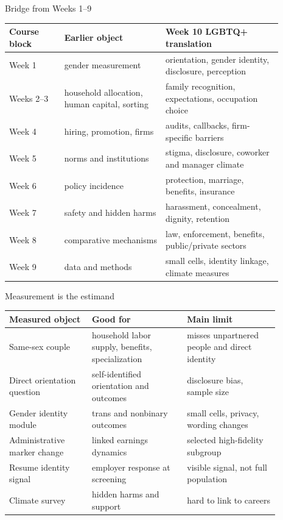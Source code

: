\documentclass[aspectratio=169,11pt]{beamer}
\begin{document}
\begin{frame}{Bridge from Weeks 1--9}
\scriptsize
\begin{tabular}{p{0.18\linewidth} p{0.33\linewidth} p{0.38\linewidth}}
\toprule
Course block & Earlier object & Week 10 LGBTQ+ translation \\
\midrule
Week 1 & gender measurement & orientation, gender identity, disclosure, perception \\
Weeks 2--3 & household allocation, human capital, sorting & family recognition, expectations, occupation choice \\
Week 4 & hiring, promotion, firms & audits, callbacks, firm-specific barriers \\
Week 5 & norms and institutions & stigma, disclosure, coworker and manager climate \\
Week 6 & policy incidence & protection, marriage, benefits, insurance \\
Week 7 & safety and hidden harms & harassment, concealment, dignity, retention \\
Week 8 & comparative mechanisms & law, enforcement, benefits, public/private sectors \\
Week 9 & data and methods & small cells, identity linkage, climate measures \\
\bottomrule
\end{tabular}
\end{frame}

\begin{frame}{Measurement is the estimand}
\scriptsize
\begin{tabular}{p{0.27\linewidth} p{0.31\linewidth} p{0.30\linewidth}}
\toprule
Measured object & Good for & Main limit \\
\midrule
Same-sex couple & household labor supply, benefits, specialization & misses unpartnered people and direct identity \\
Direct orientation question & self-identified orientation and outcomes & disclosure bias, sample size \\
Gender identity module & trans and nonbinary outcomes & small cells, privacy, wording changes \\
Administrative marker change & linked earnings dynamics & selected high-fidelity subgroup \\
Resume identity signal & employer response at screening & visible signal, not full population \\
Climate survey & hidden harms and support & hard to link to careers \\
\bottomrule
\end{tabular}
\end{frame}
\end{document}

